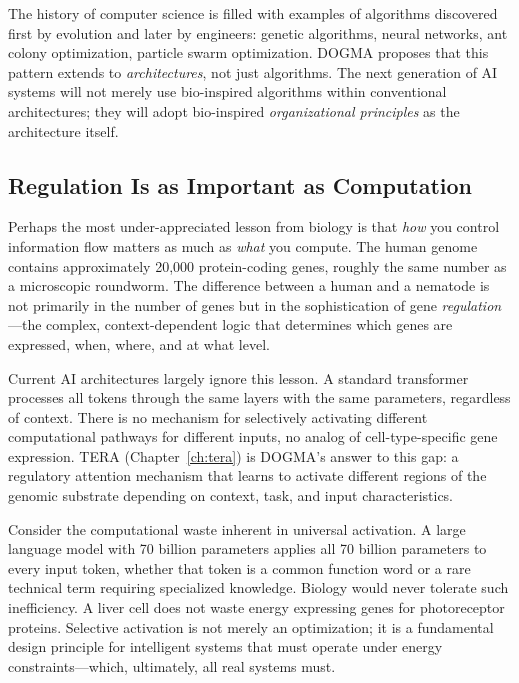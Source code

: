 \begin{keyinsight}
The history of computer science is filled with examples of algorithms discovered first by evolution and later by engineers: genetic algorithms, neural networks, ant colony optimization, particle swarm optimization. DOGMA proposes that this pattern extends to \emph{architectures}, not just algorithms. The next generation of AI systems will not merely use bio-inspired algorithms within conventional architectures; they will adopt bio-inspired \emph{organizational principles} as the architecture itself.
\end{keyinsight}

\subsection{Regulation Is as Important as Computation}

Perhaps the most under-appreciated lesson from biology is that \emph{how} you control information flow matters as much as \emph{what} you compute. The human genome contains approximately 20,000 protein-coding genes, roughly the same number as a microscopic roundworm. The difference between a human and a nematode is not primarily in the number of genes but in the sophistication of gene \emph{regulation}---the complex, context-dependent logic that determines which genes are expressed, when, where, and at what level.

Current AI architectures largely ignore this lesson. A standard transformer processes all tokens through the same layers with the same parameters, regardless of context. There is no mechanism for selectively activating different computational pathways for different inputs, no analog of cell-type-specific gene expression. TERA (Chapter~\ref{ch:tera}) is DOGMA's answer to this gap: a regulatory attention mechanism that learns to activate different regions of the genomic substrate depending on context, task, and input characteristics.

\begin{implnote}
Consider the computational waste inherent in universal activation. A large language model with 70 billion parameters applies all 70 billion parameters to every input token, whether that token is a common function word or a rare technical term requiring specialized knowledge. Biology would never tolerate such inefficiency. A liver cell does not waste energy expressing genes for photoreceptor proteins. Selective activation is not merely an optimization; it is a fundamental design principle for intelligent systems that must operate under energy constraints---which, ultimately, all real systems must.
\end{implnote}


